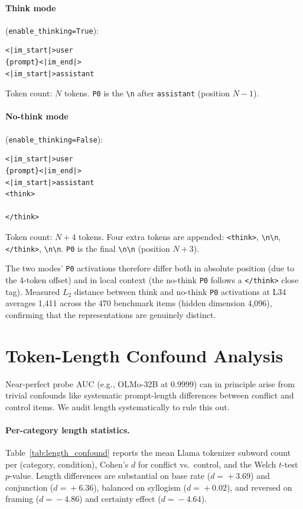 \documentclass{article}
\newcommand{\pzero}{\texttt{P0}}
\begin{document}
\paragraph{Think mode} (\texttt{enable\_thinking=True}):
\begin{verbatim}
<|im_start|>user
{prompt}<|im_end|>
<|im_start|>assistant
\end{verbatim}
Token count: $N$ tokens.  \pzero{} is the \texttt{\textbackslash{}n}
after \texttt{assistant} (position $N-1$).

\paragraph{No-think mode} (\texttt{enable\_thinking=False}):
\begin{verbatim}
<|im_start|>user
{prompt}<|im_end|>
<|im_start|>assistant
<think>

</think>

\end{verbatim}
Token count: $N+4$ tokens.  Four extra tokens are appended:
\texttt{<think>}, \texttt{\textbackslash{}n\textbackslash{}n},
\texttt{</think>}, \texttt{\textbackslash{}n\textbackslash{}n}.
\pzero{} is the final \texttt{\textbackslash{}n\textbackslash{}n}
(position $N+3$).

The two modes' \pzero{} activations therefore differ both in
absolute position (due to the 4-token offset) and in local context
(the no-think \pzero{} follows a \texttt{</think>} close tag).
Measured $L_2$ distance between think and no-think \pzero{}
activations at L34 averages 1{,}411 across the 470 benchmark items
(hidden dimension 4{,}096), confirming that the representations are
genuinely distinct.

\section{Token-Length Confound Analysis}
\label{app:length}

Near-perfect probe AUC (e.g., OLMo-32B at 0.9999) can in principle
arise from trivial confounds like systematic prompt-length differences
between conflict and control items.  We audit length systematically
to rule this out.

\paragraph{Per-category length statistics.}
Table~\ref{tab:length_confound} reports the mean Llama tokenizer
subword count per (category, condition), Cohen's $d$ for
conflict vs.\ control, and the Welch $t$-test $p$-value.  Length
differences are substantial on base rate ($d\!=\!+3.69$) and
conjunction ($d\!=\!+6.36$), balanced on syllogism ($d\!=\!+0.02$),
and reversed on framing ($d\!=\!-4.86$) and certainty effect
($d\!=\!-4.64$).
\end{document}
